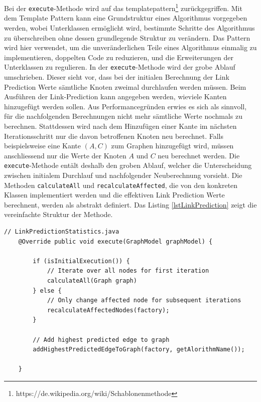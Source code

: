 Bei der \texttt{execute}-Methode wird auf das \acs{templatepattern}\footnote{https://de.wikipedia.org/wiki/Schablonenmethode} zurückgegriffen. Mit dem Template Pattern kann eine Grundstruktur eines Algorithmus vorgegeben werden, wobei Unterklassen ermöglicht wird, bestimmte Schritte des Algorithmus zu überschreiben ohne dessen grundlegende Struktur zu verändern.
Das Pattern wird hier verwendet, um die unveränderlichen Teile eines Algorithmus einmalig zu implementieren, doppelten Code zu reduzieren, und die Erweiterungen der Unterklassen zu regulieren.
In der \texttt{execute}-Methode wird der grobe Ablauf umschrieben.
Dieser sieht vor, dass bei der initialen Berechnung der Link Prediction Werte sämtliche Knoten zweimal durchlaufen werden müssen.
Beim Ausführen der Link-Prediction kann angegeben werden, wieviele Kanten hinzugefügt werden sollen.
Aus Performancegründen erwies es sich als sinnvoll, für die nachfolgenden Berechnungen nicht mehr sämtliche Werte nochmals zu berechnen.
Stattdessen wird nach dem Hinzufügen einer Kante im nächsten Iterationsschritt nur die davon betroffenen Knoten neu berechnet.
Falls beispielsweise eine Kante $(A, C)$ zum Graphen hinzugefügt wird, müssen anschliessend nur die Werte der Knoten $A$ und $C$ neu berechnet werden.
Die \texttt{execute}-Methode entält deshalb den groben Ablauf, welcher die Unterscheidung zwischen initialem Durchlauf und nachfolgender Neuberechnung vorsieht.
Die Methoden \texttt{calculateAll} und \texttt{recalculateAffected}, die von den konkreten Klassen implementiert werden und die effektiven Link Prediction Werte berechnent, werden als abstrakt definiert.
Das Listing \ref{lstLinkPrediction} zeigt die vereinfachte Struktur der Methode.

\begin{lstlisting}[caption={Link prediction implementation},label=lstLinkPrediction]
    // LinkPredictionStatistics.java
    @Override public void execute(GraphModel graphModel) {

        if (isInitialExecution()) {
            // Iterate over all nodes for first iteration
            calculateAll(Graph graph)
        } else {
            // Only change affected node for subsequent iterations
            recalculateAffectedNodes(factory);
        }

        // Add highest predicted edge to graph
        addHighestPredictedEdgeToGraph(factory, getAlorithmName());

    }
\end{lstlisting}

